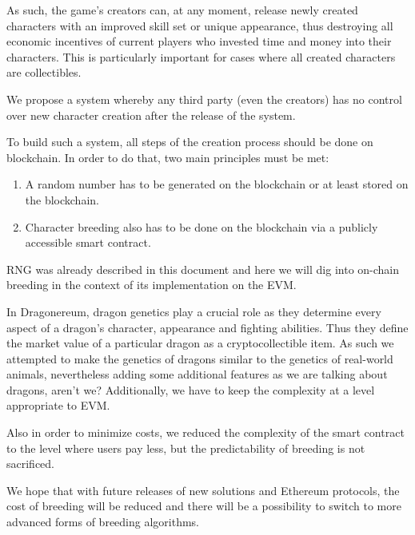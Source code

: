\documentclass[12pt]{article}
\begin{document}
As such, the game’s creators can, at any moment, release newly created characters with an improved skill set or unique appearance, thus destroying all economic incentives of current players who invested time and money into their characters. This is particularly important for cases where all created characters are collectibles.\par

We propose a system whereby any third party (even the creators) has no control over new character creation after the release of the system.\par

To build such a system, all steps of the creation process should be done on blockchain. In order to do that, two main principles must be met:\par

\begin{enumerate}
	\item A random number has to be generated on the blockchain or at least stored on the blockchain.\par

	\item Character breeding also has to be done on the blockchain via a publicly accessible smart contract.
\end{enumerate}\par

RNG was already described in this document and here we will dig into on-chain breeding in the context of its implementation on the EVM.\par

In Dragonereum, dragon genetics play a crucial role as they determine every aspect of a dragon’s character, appearance and fighting abilities. Thus they define the market value of a particular dragon as a cryptocollectible item. As such we attempted to make the genetics of dragons similar to the genetics of real-world animals, nevertheless adding some additional features as we are talking about dragons, aren’t we? Additionally, we have to keep the complexity at a level appropriate to EVM.\par

Also in order to minimize costs, we reduced the complexity of the smart contract to the level where users pay less, but the predictability of breeding is not sacrificed.\par

We hope that with future releases of new solutions and Ethereum protocols, the cost of breeding will be reduced and there will be a possibility to switch to more advanced forms of breeding algorithms.\par
\end{document}
